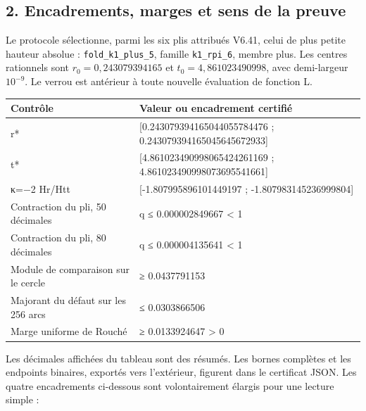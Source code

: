 \documentclass[
  10pt,
  a4paper,
]{article}
\begin{document}
\hypertarget{encadrements-marges-et-sens-de-la-preuve}{%
\subsection{2. Encadrements, marges et sens de la
preuve}\label{encadrements-marges-et-sens-de-la-preuve}}

Le protocole sélectionne, parmi les six plis attribués V6.41, celui de
plus petite hauteur absolue : \texttt{fold\_k1\_plus\_5}, famille
\texttt{k1\_rpi\_6}, membre plus. Les centres rationnels sont
\(r_0=0,243079394165\) et \(t_0=4,861023490998\), avec demi-largeur
\(10^{-9}\). Le verrou est antérieur à toute nouvelle évaluation de
fonction L.

\begin{longtable}[]{@{}ll@{}}
\toprule\noalign{}
Contrôle & Valeur ou encadrement certifié \\
\midrule\noalign{}
\endhead
\bottomrule\noalign{}
\endlastfoot
r* & {[}0.243079394165044055784476 ; 0.243079394165045645672933{]} \\
t* & {[}4.861023490998065424261169 ; 4.861023490998073695541661{]} \\
κ=−2 Hr/Htt & {[}-1.807995896101449197 ; -1.807983145236999804{]} \\
Contraction du pli, 50 décimales & q ≤ 0.000002849667 \textless{} 1 \\
Contraction du pli, 80 décimales & q ≤ 0.000004135641 \textless{} 1 \\
Module de comparaison sur le cercle & ≥ 0.0437791153 \\
Majorant du défaut sur les 256 arcs & ≤ 0.0303866506 \\
Marge uniforme de Rouché & ≥ 0.0133924647 \textgreater{} 0 \\
\end{longtable}

Les décimales affichées du tableau sont des résumés. Les bornes
complètes et les endpoints binaires, exportés vers l'extérieur, figurent
dans le certificat JSON. Les quatre encadrements ci-dessous sont
volontairement élargis pour une lecture simple :
\end{document}

